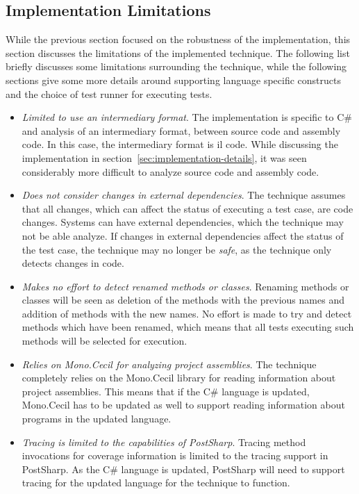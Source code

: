 \documentclass[a4paper,english,12pt]{report}
\begin{document}
\subsection{Implementation Limitations}\label{sec:implementation-limitations}
While the previous section focused on the robustness of the implementation, this section discusses the limitations of the implemented technique. The following list briefly discusses some limitations surrounding the technique, while the following sections give some more details around supporting language specific constructs and the choice of test runner for executing tests.

\begin{itemize}
  \item\textit{Limited to use an intermediary format}. The implementation is specific to C\# and analysis of an intermediary format, between source code and assembly code. In this case, the intermediary format is \gls{il} code. While discussing the implementation in section~\ref{sec:implementation-details}, it was seen considerably more difficult to analyze source code and assembly code.
  \item\textit{Does not consider changes in external dependencies}. The technique assumes that all changes, which can affect the status of executing a test case, are code changes. Systems can have external dependencies, which the technique may not be able analyze. If changes in external dependencies affect the status of the test case, the technique may no longer be \textit{safe}, as the technique only detects changes in code.
  \item\textit{Makes no effort to detect renamed methods or classes}. Renaming methods or classes will be seen as deletion of the methods with the previous names and addition of methods with the new names. No effort is made to try and detect methods which have been renamed, which means that all tests executing such methods will be selected for execution.
  \item\textit{Relies on Mono.Cecil for analyzing project assemblies}. The technique completely relies on the Mono.Cecil library for reading information about project assemblies. This means that if the C\# language is updated, Mono.Cecil has to be updated as well to support reading information about programs in the updated language.
  \item\textit{Tracing is limited to the capabilities of PostSharp}. Tracing method invocations for coverage information is limited to the tracing support in PostSharp. As the C\# language is updated, PostSharp will need to support tracing for the updated language for the technique to function.

\end{itemize}
\end{document}
